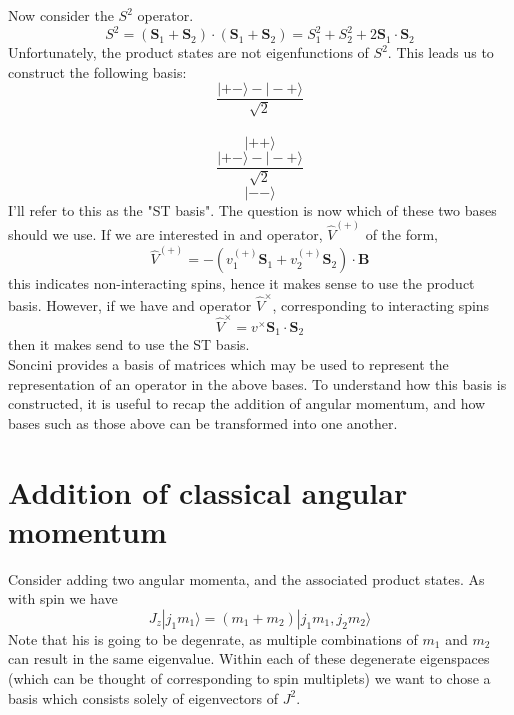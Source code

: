 \documentclass[12pt]{article}
\begin{document}
\noindent Now consider the $S^{2}$ operator. 
\begin{equation}
S^{2} = (\mathbf{S}_{1}+\mathbf{S}_{2})\cdot (\mathbf{S}_{1}+\mathbf{S}_{2})= 
S^{2}_{1}+S^{2}_{2} + 2\mathbf{S}_{1}\cdot \mathbf{S}_{2}
\end{equation}
\noindent Unfortunately, the product states are not eigenfunctions of $S^{2}$. This
leads us to construct the following basis:
\begin{equation*}
\frac{|+-\rangle - | -+ \rangle}{\sqrt{2}}
\end{equation*}
\\
\begin{equation*}
|++\rangle
\end{equation*}
\begin{equation*}
\frac{|+-\rangle - | -+ \rangle}{\sqrt{2}}
\end{equation*}
\begin{equation*}
|--\rangle
\end{equation*}
\noindent I'll refer to this as the "ST basis". The question is now which of these two bases should we use. If 
we are interested in and operator, $\hat{V}^{(+)}$ of the form,
\begin{equation}
\hat{V}^{(+)} = -(v^{(+)}_{1}\mathbf{S}_{1} + v^{(+)}_{2}\mathbf{S}_{2}) \cdot \mathbf{B}
\end{equation}
this indicates non-interacting spins, hence it makes sense to use the product basis.
However, if we have and operator $\hat{V}^{\times}$, corresponding to 
interacting spins
\begin{equation}
\hat{V}^{\times} = v^{\times}\mathbf{S}_{1}\cdot\mathbf{S}_{2}
\end{equation}
then it makes send to use the ST basis.\\

\noindent Soncini provides a basis of matrices which may be used to represent 
the representation of an operator in the above bases. To understand how
this basis is constructed, it is useful to recap the addition of angular momentum,
and how bases such as those above can be transformed into one another. 

\section{Addition of classical angular momentum}
Consider adding two angular momenta, and the associated product states. As
with spin we have
\begin{equation}
J_{z}|j_{1}m_{1} \rangle = (m_{1}+m_{2})|j_{1}m_{1}, j_{2}m_{2} \rangle
\end{equation}
Note that his is going to be degenrate, as multiple combinations of $m_{1}$ and $m_{2}$
can result in the same eigenvalue. Within each of these degenerate eigenspaces 
(which can be thought of corresponding to spin multiplets) we want to chose a 
basis which consists solely of eigenvectors of $J^{2}$.\\
\end{document}
